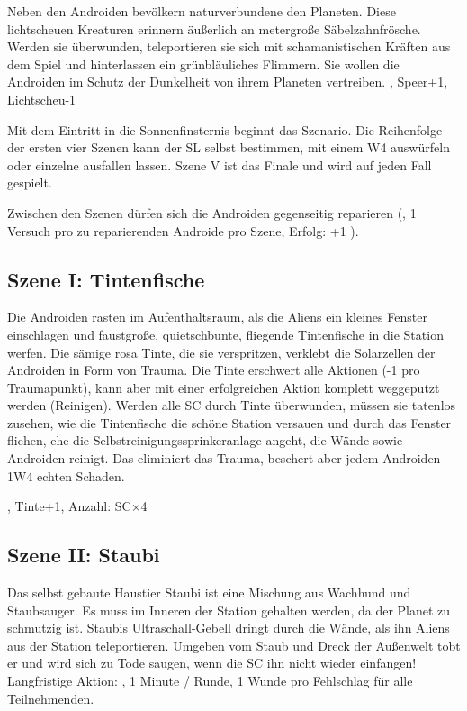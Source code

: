 {		Neben den Androiden bevölkern naturverbundene  den Planeten. Diese lichtscheuen Kreaturen erinnern äußerlich an metergroße Säbelzahnfrösche. Werden sie überwunden, teleportieren sie sich mit schamanistischen Kräften aus dem Spiel und hinterlassen ein grünbläuliches Flimmern. Sie wollen die Androiden im Schutz der Dunkelheit von ihrem Planeten vertreiben. , Speer+1, Lichtscheu-1


		\noindent
		Mit dem Eintritt in die Sonnenfinsternis beginnt das Szenario. Die Reihenfolge der ersten vier Szenen kann der SL selbst bestimmen, mit einem W4 auswürfeln oder einzelne ausfallen lassen. Szene V ist das Finale und wird auf jeden Fall gespielt.

		Zwischen den Szenen dürfen sich die Androiden gegenseitig reparieren (, 1 Versuch pro zu reparierenden Androide pro Szene, Erfolg: +1 \HD).

		\subsection{Szene I: Tintenfische}

		\noindent
		Die Androiden rasten im Aufenthaltsraum, als die Aliens ein kleines Fenster einschlagen und faustgroße, quietschbunte, fliegende Tintenfische in die Station werfen. Die sämige rosa Tinte, die sie verspritzen, verklebt die Solarzellen der Androiden in Form von Trauma. Die Tinte erschwert alle Aktionen (-1 pro Traumapunkt), kann aber mit einer erfolgreichen Aktion komplett weggeputzt werden (Reinigen). Werden alle SC durch Tinte überwunden, müssen sie tatenlos zusehen, wie die Tintenfische die schöne Station versauen und durch das Fenster fliehen, ehe die Selbstreinigungssprinkeranlage angeht, die Wände sowie Androiden reinigt. Das eliminiert das Trauma, beschert aber jedem Androiden 1W4 echten Schaden.

		, Tinte+1, Anzahl: SC×4

		\subsection{Szene II: Staubi}

		\noindent
		Das selbst gebaute Haustier Staubi ist eine Mischung aus Wachhund und Staubsauger. Es muss im Inneren der Station gehalten werden, da der Planet zu schmutzig ist. Staubis Ultraschall-Gebell dringt durch die Wände, als ihn Aliens aus der Station teleportieren. Umgeben vom Staub und Dreck der Außenwelt tobt er und wird sich zu Tode saugen, wenn die SC ihn nicht wieder einfangen! Langfristige Aktion: , 1 Minute / Runde, 1 Wunde pro Fehlschlag für alle Teilnehmenden.

}

